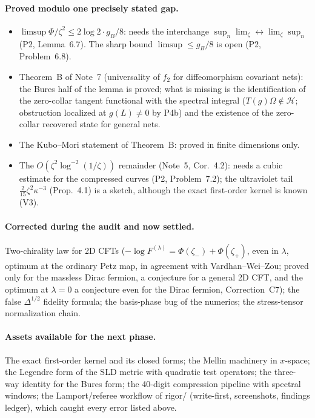 \documentclass[11pt]{article}
\theoremstyle{accent}
\theoremstyle{definition}
\begin{document}
\paragraph{Proved modulo one precisely stated gap.}
\begin{itemize}[leftmargin=1.6em,itemsep=1pt]
\item \(\limsup\Phi/\zeta^2\le2\log2\cdot g_B/8\): needs the interchange \(\sup_n\lim_\zeta\leftrightarrow\lim_\zeta\sup_n\) (P2, Lemma~6.7).  The sharp bound \(\limsup\le g_B/8\) is open (P2, Problem~6.8).
\item Theorem~B of Note~7 (universality of \(f_2\) for diffeomorphism covariant nets): the Bures half of the lemma is proved; what is missing is the identification of the zero-collar tangent functional with the spectral integral (\(T(g)\Omega\notin\mathcal H\); obstruction localized at \(g(L)\neq0\) by P4b) and the existence of the zero-collar recovered state for general nets.
\item The Kubo--Mori statement of Theorem~B: proved in finite dimensions only.
\item The \(O(\zeta^2\log^{-2}(1/\zeta))\) remainder (Note~5, Cor.~4.2): needs a cubic estimate for the compressed curves (P2, Problem~7.2); the ultraviolet tail \(\frac2{15}\zeta^2\kappa^{-3}\) (Prop.~4.1) is a sketch, although the exact first-order kernel is known (V3).
\end{itemize}

\paragraph{Corrected during the audit and now settled.}
Two-chirality law for 2D CFTs (\(-\log F^{(\lambda)}=\Phi(\zeta_-)+\Phi(\zeta_+)\), even in \(\lambda\), optimum at the ordinary Petz map, in agreement with Vardhan--Wei--Zou; proved only for the massless Dirac fermion, a conjecture for a general 2D CFT, and the optimum at \(\lambda=0\) a conjecture even for the Dirac fermion, Correction~C7); the false \(\Delta^{1/2}\) fidelity formula; the basis-phase bug of the numerics; the stress-tensor normalization chain.

\paragraph{Assets available for the next phase.}
The exact first-order kernel and its closed forms; the Mellin machinery in \(x\)-space; the Legendre form of the SLD metric with quadratic test operators; the three-way identity for the Bures form; the 40-digit compression pipeline with spectral windows; the Lamport/referee workflow of rigor/ (write-first, screenshots, findings ledger), which caught every error listed above.
\end{document}
